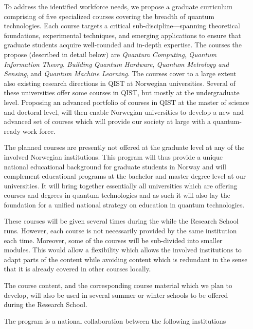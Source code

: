 \documentclass{scrreprt}
\begin{document}
To address the identified workforce needs, we propose a graduate
curriculum comprising of five specialized courses covering the breadth of
quantum technologies. Each course targets a critical
sub-discipline—spanning theoretical foundations, experimental
techniques, and emerging applications to ensure that graduate students acquire
well-rounded and in-depth expertise. The courses the propose (described in detail below) are
\textit{Quantum Computing}, \textit{Quantum Information Theory}, \textit{Building Quantum Hardware},
\textit{Quantum Metrology and Sensing}, and \textit{Quantum Machine Learning}. The courses cover to a large extent also existing research directions in QIST at Norwegian universities. Several of these universities offer some courses in QIST, but mostly at the undergraduate level. Proposing an advanced portfolio of courses in QIST at the master of science and doctoral level, will then enable Norwegian  universities to develop a new and advanced set of courses which will provide our society at large with a quantum-ready work force.

The planned  courses are presently not offered at the graduate level at any
of the involved Norwegian institutions.  This program will thus provide
a unique national educational background for graduate students in
Norway and will complement educational programs at the bachelor and
master degree level at our universities. It will bring together
essentially all universities which are offering courses and degrees in
quantum technologies and as such it will also lay the foundation for a
unified national strategy on education in quantum technologies.

These courses will be given several times during the while the Research School runs. However, each course is not necessarily provided by the same institution each time. Moreover, some of the courses will be sub-divided into smaller modules. This would allow a flexibility which allows the involved institutions to adapt parts of the content while avoiding content which is redundant in the sense that it is already covered in other courses locally.

The course content, and the corresponding course material which we plan to develop, will also be used in several summer or winter schools to be offered during the Research School.


The program is a national collaboration between the following institutions
\end{document}
